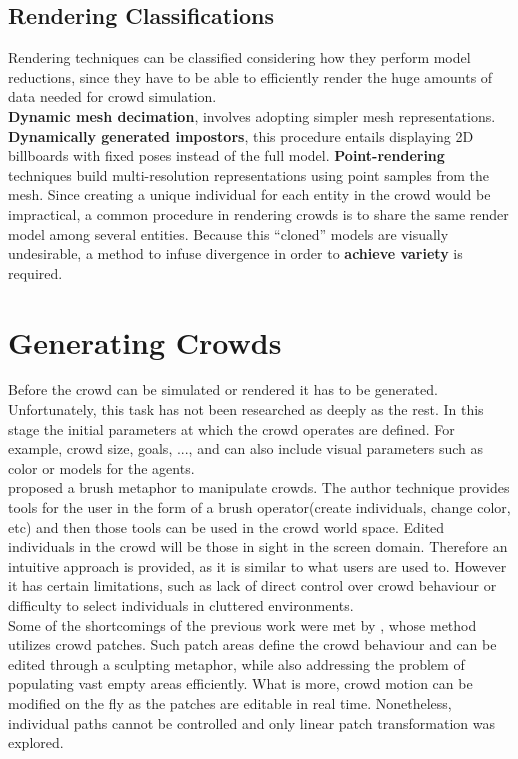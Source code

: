 \documentclass[6pt]{article} %
\begin{document}
\begin{multicols}{2}
\subsection{Rendering Classifications}
\label{subsec:RenderingClassification}

Rendering techniques can be classified considering how they perform model reductions, since they have to be able to efficiently render the huge amounts of data needed for crowd simulation.\\

\textbf{Dynamic mesh decimation}, involves adopting simpler mesh representations.
\textbf{Dynamically generated impostors}, this procedure entails displaying 2D billboards with fixed poses instead of the full model.
\textbf{Point-rendering} techniques build multi-resolution representations using point samples from the mesh.
Since creating a unique individual for each entity in the crowd would be impractical, a common procedure in rendering crowds is to share the same render model among several entities.
Because this ``cloned'' models are visually undesirable, a method to infuse divergence in order to \textbf{achieve variety} is required. 

\section{Generating Crowds}
\label{sec:CrowdGen}

Before the crowd can be simulated or rendered it has to be generated.
Unfortunately, this task has not been researched as deeply as the rest.
In this stage the initial parameters at which the crowd operates are defined.
For example, crowd size, goals, ..., and can also include visual parameters such as color or models for the agents.\\

\cite{Ulicny2004} proposed a brush metaphor to manipulate crowds.
The author technique provides tools for the user in the form of a brush operator(create individuals, change color, etc) and then those tools can be used in the crowd world space.
Edited individuals in the crowd will be those in sight in the screen domain.
Therefore an intuitive approach is provided, as it is similar to what users are used to.
However it has certain limitations, such as lack of direct control over crowd behaviour or difficulty to select individuals in cluttered environments.\\

Some of the shortcomings of the previous work were met by \cite{Jordao2014}, whose method utilizes crowd patches.
Such patch areas define the crowd behaviour and can be edited through a sculpting metaphor, while also addressing the problem of populating vast empty areas efficiently.
What is more, crowd motion can be modified on the fly as the patches are editable in real time.
Nonetheless, individual paths cannot be controlled and only linear patch transformation was explored.


\end{multicols}
\end{document}

